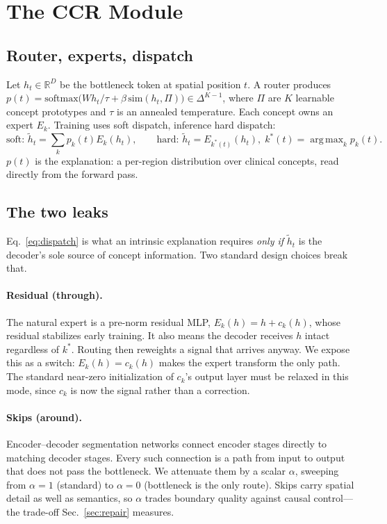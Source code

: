 \documentclass[runningheads]{llncs}
\DeclareMathOperator*{\argmax}{arg\,max}
\begin{document}
\section{The CCR Module}\label{sec:method}
\subsection{Router, experts, dispatch}
Let $h_t\in\mathbb{R}^D$ be the bottleneck token at spatial position $t$. A router produces
$p(t)=\mathrm{softmax}\big(W h_t/\tau + \beta\,\mathrm{sim}(h_t,\Pi)\big)\in\Delta^{K-1}$,
where $\Pi$ are $K$ learnable concept prototypes and $\tau$ is an annealed temperature. Each
concept owns an expert $E_k$. Training uses soft dispatch, inference hard dispatch:
\begin{equation}
\text{soft: } \tilde h_t=\textstyle\sum_k p_k(t)E_k(h_t),
\qquad
\text{hard: } \tilde h_t=E_{k^\ast(t)}(h_t),\; k^\ast(t)=\argmax_k p_k(t).
\label{eq:dispatch}
\end{equation}
$p(t)$ is the explanation: a per-region distribution over clinical concepts, read directly from
the forward pass.

\subsection{The two leaks}\label{sec:leaks}
Eq.~\ref{eq:dispatch} is what an intrinsic explanation requires \emph{only if} $\tilde h_t$ is
the decoder's sole source of concept information. Two standard design choices break that.

\paragraph{Residual (through).} The natural expert is a pre-norm residual MLP,
$E_k(h)=h+c_k(h)$, whose residual stabilizes early training. It also means the decoder receives
$h$ intact regardless of $k^\ast$. Routing then reweights a signal that arrives anyway. We
expose this as a switch: $E_k(h)=c_k(h)$ makes the expert transform the only path. The standard
near-zero initialization of $c_k$'s output layer must be relaxed in this mode, since $c_k$ is
now the signal rather than a correction.

\paragraph{Skips (around).} Encoder--decoder segmentation networks connect encoder stages
directly to matching decoder stages. Every such connection is a path from input to output that
does not pass the bottleneck. We attenuate them by a scalar $\alpha$, sweeping from $\alpha{=}1$
(standard) to $\alpha{=}0$ (bottleneck is the only route). Skips carry spatial detail as well as
semantics, so $\alpha$ trades boundary quality against causal control---the trade-off
Sec.~\ref{sec:repair} measures.
\end{document}
